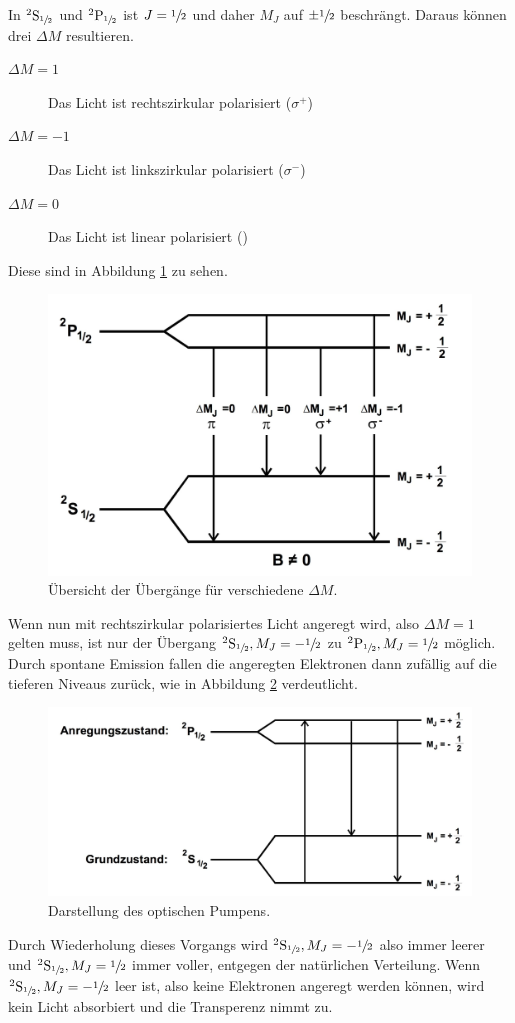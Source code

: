 In ${}^2\mathrm{S}_{\sfrac{1}{2}}$ und ${}^2\mathrm{P}_{\sfrac{1}{2}}$ ist $J={\sfrac{1}{2}}$ und daher $M_J$ auf $\pm \sfrac{1}{2}$ beschrängt. Daraus können drei $\Delta M$ resultieren.
\begin{description}
	\item[$\Delta M=1$] Das Licht ist rechtszirkular polarisiert ($\sigma^{+}$)
	\item[$\Delta M=-1$] Das Licht ist linkszirkular polarisiert ($\sigma^{-}$)
	\item[$\Delta M=0$] Das Licht ist linear polarisiert (\pi)
\end{description}
Diese sind in Abbildung \ref{fig:ubergang} zu sehen.
\begin{figure}
	\centering
	\includegraphics[width=0.8\linewidth]{img/ubergange.jpg}
	\caption{Übersicht der Übergänge für verschiedene $\Delta M$.}
	\label{fig:ubergang}
\end{figure}
Wenn nun mit rechtszirkular polarisiertes Licht angeregt wird, also $\Delta M=1$ gelten muss, ist nur der Übergang ${}^2\mathrm{S}_{\sfrac{1}{2}}, M_J=-\sfrac{1}{2}$ zu ${}^2\mathrm{P}_{\sfrac{1}{2}}, M_J=\sfrac{1}{2}$ möglich. Durch spontane Emission fallen die angeregten Elektronen dann zufällig auf die tieferen Niveaus zurück, wie in Abbildung \ref{fig:optPumpen} verdeutlicht.
\begin{figure}
	\centering
	\includegraphics[width=0.8\linewidth]{img/optPumpen.jpg}
	\caption{Darstellung des optischen Pumpens.\cite{V21}}
	\label{fig:optPumpen}
\end{figure}
Durch Wiederholung dieses Vorgangs wird ${}^2\mathrm{S}_{\sfrac{1}{2}}, M_J=-\sfrac{1}{2}$ also immer leerer und ${}^2\mathrm{S}_{\sfrac{1}{2}},M_J=\sfrac{1}{2}$ immer voller, entgegen der natürlichen Verteilung. Wenn  ${}^2\mathrm{S}_{\sfrac{1}{2}}, M_J=-\sfrac{1}{2}$ leer ist, also keine Elektronen angeregt werden können, wird kein Licht absorbiert und die Transperenz nimmt zu.
